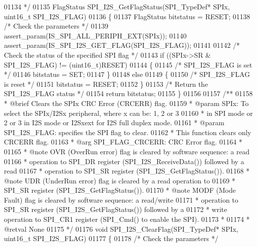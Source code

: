 \begin{DoxyCode}
01134 \textcolor{comment}{  */}
01135 FlagStatus SPI_I2S_GetFlagStatus(SPI\_TypeDef* SPIx, uint16\_t SPI\_I2S\_FLAG)
01136 \{
01137   FlagStatus bitstatus = RESET;
01138   \textcolor{comment}{/* Check the parameters */}
01139   assert_param(IS\_SPI\_ALL\_PERIPH\_EXT(SPIx));
01140   assert_param(IS\_SPI\_I2S\_GET\_FLAG(SPI\_I2S\_FLAG));
01141 
01142   \textcolor{comment}{/* Check the status of the specified SPI flag */}
01143   \textcolor{keywordflow}{if} ((SPIx->SR & SPI\_I2S\_FLAG) != (uint16\_t)RESET)
01144   \{
01145     \textcolor{comment}{/* SPI\_I2S\_FLAG is set */}
01146     bitstatus = SET;
01147   \}
01148   \textcolor{keywordflow}{else}
01149   \{
01150     \textcolor{comment}{/* SPI\_I2S\_FLAG is reset */}
01151     bitstatus = RESET;
01152   \}
01153   \textcolor{comment}{/* Return the SPI\_I2S\_FLAG status */}
01154   \textcolor{keywordflow}{return}  bitstatus;
01155 \}
01156 
01157 \textcolor{comment}{/**}
01158 \textcolor{comment}{  * @brief  Clears the SPIx CRC Error (CRCERR) flag.}
01159 \textcolor{comment}{  * @param  SPIx: To select the SPIx/I2Sx peripheral, where x can be: 1, 2 or 3 }
01160 \textcolor{comment}{  *         in SPI mode or 2 or 3 in I2S mode or I2Sxext for I2S full duplex mode. }
01161 \textcolor{comment}{  * @param  SPI\_I2S\_FLAG: specifies the SPI flag to clear. }
01162 \textcolor{comment}{  *          This function clears only CRCERR flag.}
01163 \textcolor{comment}{  *            @arg SPI\_FLAG\_CRCERR: CRC Error flag.  }
01164 \textcolor{comment}{  *  }
01165 \textcolor{comment}{  * @note   OVR (OverRun error) flag is cleared by software sequence: a read }
01166 \textcolor{comment}{  *          operation to SPI\_DR register (SPI\_I2S\_ReceiveData()) followed by a read }
01167 \textcolor{comment}{  *          operation to SPI\_SR register (SPI\_I2S\_GetFlagStatus()).}
01168 \textcolor{comment}{  * @note   UDR (UnderRun error) flag is cleared by a read operation to }
01169 \textcolor{comment}{  *          SPI\_SR register (SPI\_I2S\_GetFlagStatus()).   }
01170 \textcolor{comment}{  * @note   MODF (Mode Fault) flag is cleared by software sequence: a read/write }
01171 \textcolor{comment}{  *          operation to SPI\_SR register (SPI\_I2S\_GetFlagStatus()) followed by a }
01172 \textcolor{comment}{  *          write operation to SPI\_CR1 register (SPI\_Cmd() to enable the SPI).}
01173 \textcolor{comment}{  *  }
01174 \textcolor{comment}{  * @retval None}
01175 \textcolor{comment}{  */}
01176 \textcolor{keywordtype}{void} SPI_I2S_ClearFlag(SPI\_TypeDef* SPIx, uint16\_t SPI\_I2S\_FLAG)
01177 \{
01178   \textcolor{comment}{/* Check the parameters */}

\end{DoxyCode}
